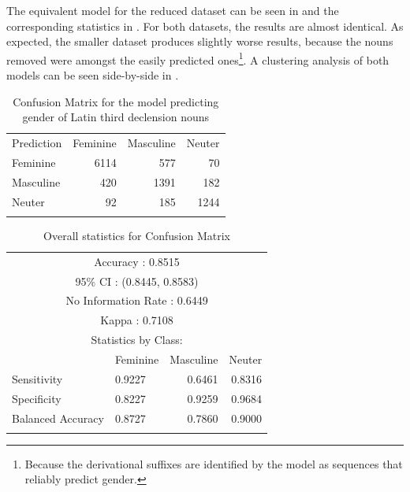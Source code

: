 The equivalent model for the reduced dataset can be seen in  and the corresponding statistics in . For both datasets, the results are almost identical. As expected, the smaller dataset produces slightly worse results, because the nouns removed were amongst the easily predicted ones\footnote{Because the derivational suffixes are identified by the model as sequences that reliably predict gender.}. A clustering analysis of both models can be seen side-by-side in .

\begin{table}[t]
  \centering
  \begin{tabular}{lrrr}
    \lsptoprule
    \multicolumn{4}{c}{Reference}              \\
    \midrule
    Prediction & Feminine & Masculine & Neuter \\
    Feminine   & 6114     & 577       & 70     \\
    Masculine  & 420      & 1391      & 182    \\
    Neuter     & 92       & 185       & 1244   \\
    \lspbottomrule
  \end{tabular}
  \caption{Confusion Matrix for the model predicting gender of Latin third declension nouns}\label{tab:gender-lat-2}
\end{table}

\begin{table}
  \centering
  \begin{tabular}{llrr}
    \lsptoprule
    \multicolumn{4}{c}{Overall statistics:} \\

    \midrule
    \multicolumn{4}{c}{Accuracy : 0.8515}             \\
    \multicolumn{4}{c}{95\% CI : (0.8445, 0.8583)}    \\
    \multicolumn{4}{c}{No Information Rate : 0.6449}  \\
    \multicolumn{4}{c}{Kappa : 0.7108}                \\
    \midrule
    \multicolumn{4}{c}{Statistics by Class:}          \\
    \midrule
                      & Feminine & Masculine & Neuter \\
    Sensitivity       & 0.9227   & 0.6461    & 0.8316 \\
    Specificity       & 0.8227   & 0.9259    & 0.9684 \\
    Balanced Accuracy & 0.8727   & 0.7860    & 0.9000 \\
    \lspbottomrule
  \end{tabular}
  \caption{Overall statistics for Confusion Matrix }\label{tab:gender-lat-stats-2}
\end{table}

